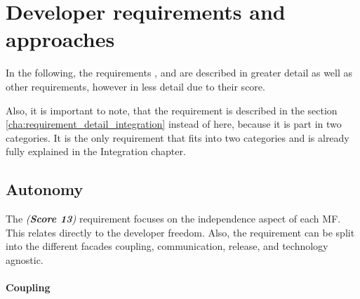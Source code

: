 

\section{Developer requirements and approaches}\label{cha:requirement_detail_developer}

In the following, the requirements \textit{}, \textit{} and \textit{} are described in greater detail as well as other requirements, however in less detail due to their score.

Also, it is important to note, that the \textit{} requirement is described in the section \ref{cha:requirement_detail_integration} instead of here, because it is part in two categories.
It is the only requirement that fits into two categories and is already fully explained in the Integration chapter.





\subsection{Autonomy}\label{cha:requirement_detail_developer_autonomy}

The \textit{ (\textbf{Score 13})} requirement focuses on the independence aspect of each \ac{MF}.
This relates directly to the developer freedom.
Also, the \textit{} requirement can be split into the different facades coupling, communication, release, and technology agnostic.



\paragraph{Coupling}

